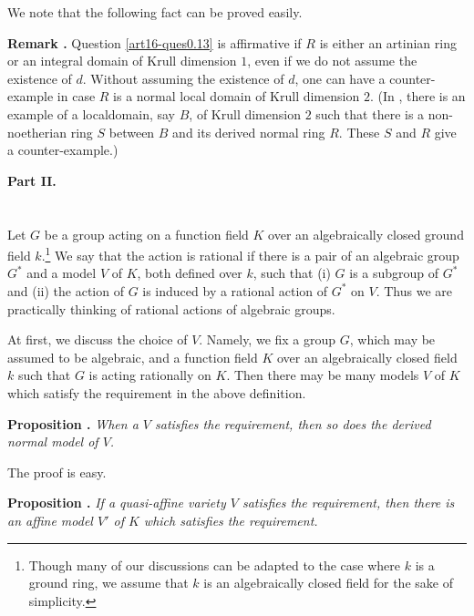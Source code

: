 We note that the following fact can be proved easily.

\medskip
\noindent
{\bf Remark .\label{art16-rem0.14}}
Question \ref{art16-ques0.13} is affirmative if $R$ is either an artinian ring or an integral domain of Krull dimension $1$, even if we do not assume the existence of $d$. Without assuming the existence of $d$, one can have a counter-example in case $R$ is a normal local domain of Krull dimension $2$. (In \cite{art16-key-L}, there is an example of a local\pageoriginale domain, say $B$, of Krull dimension $2$ such that there is a non-noetherian ring $S$ between $B$ and its derived normal ring $R$. These $S$ and $R$ give a counter-example.)


\bigskip
\medskip

\begin{center}
{\bf\Large Part II.}
\end{center}

\section{}\label{art16-sec1}
Let $G$ be a group acting on a function field $K$ over an algebraically closed ground field $k$.\footnote{Though many of our discussions can be adapted to the case where $k$ is a ground ring, we assume that $k$ is an algebraically closed field for the sake of simplicity.} We say that the action is rational if there is a pair of an algebraic group $G^{*}$ and a model $V$ of $K$, both defined over $k$, such that (i) $G$ is a subgroup of $G^{*}$ and (ii) the action of $G$ is induced by a rational action of $G^{*}$ on $V$. Thus we are practically thinking of rational actions of algebraic groups.

At first, we discuss the choice of $V$. Namely, we fix a group $G$, which may be assumed to be algebraic, and a function field $K$ over an algebraically closed field $k$ such that $G$ is acting rationally on $K$. Then there may be many models $V$ of $K$ which satisfy the requirement in the above definition.

\medskip
\noindent
{\bf Proposition .\label{art16-prop1.1}}
{\em When a $V$ satisfies the requirement, then so does the derived normal model of $V$.}
\smallskip

The proof is easy.

\medskip
\noindent
{\bf Proposition .\label{art16-prop1.2}}
{\em If a quasi-affine variety $V$ satisfies the requirement, then there is an affine model $V'$ of $K$ which satisfies the requirement.}

